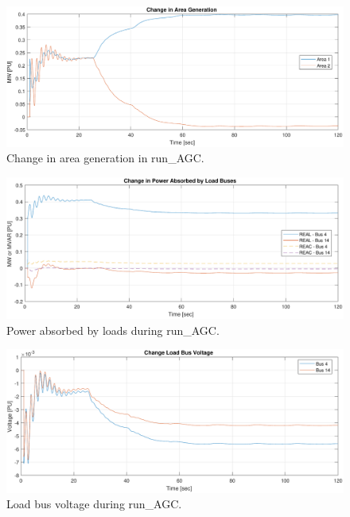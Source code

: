 \begin{figure}[H]
	\centering
	\footnotesize
	\includegraphics[width=\linewidth]{examples/agc/run-AGC-3}
	\caption{Change in area generation in run\_AGC.}
	\label{fig: runAGC area gen}
\end{figure}%


\begin{figure}[H]
	\centering
	\footnotesize
	\includegraphics[width=\linewidth]{examples/agc/run-AGC-4}
	\caption{Power absorbed by loads during run\_AGC.}
	\label{fig: runAGC power}
\end{figure}%

\begin{figure}[H]
	\centering
	\footnotesize
	\includegraphics[width=\linewidth]{examples/agc/run-AGC-5}
	\caption{Load bus voltage during run\_AGC.}
	\label{fig: runAGC bus v}
\end{figure}%



